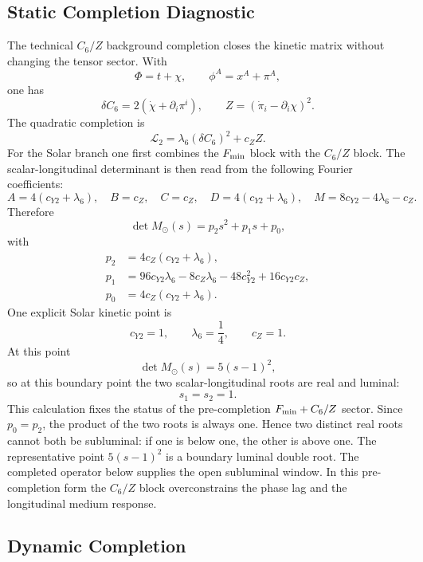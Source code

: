 \documentclass[12pt,a4paper]{article}
\begin{document}
\subsection{Static Completion Diagnostic}

The technical $C_6/Z$ background completion closes the kinetic matrix without changing the tensor sector. With
\[
\Phi=t+\chi,\qquad \phi^A=x^A+\pi^A,
\]
one has
\[
\delta C_6=2(\dot\chi+\partial_i\pi^i),
\qquad
Z=(\dot\pi_i-\partial_i\chi)^2.
\]
The quadratic completion is
\[
\mathcal L_2=\lambda_6(\delta C_6)^2+c_Z Z.
\]
For the Solar branch one first combines the $F_{\rm min}$ block with the
$C_6/Z$ block.  The scalar-longitudinal determinant is then read from the
following Fourier coefficients:
\[
A=4(c_{Y2}+\lambda_6),\quad B=c_Z,\quad C=c_Z,\quad
D=4(c_{Y2}+\lambda_6),\quad
M=8c_{Y2}-4\lambda_6-c_Z.
\]
Therefore
\[
\det M_\odot(s)=p_2s^2+p_1s+p_0,
\]
with
\begin{align*}
p_2&=4c_Z(c_{Y2}+\lambda_6),\\
p_1&=96c_{Y2}\lambda_6-8c_Z\lambda_6-48c_{Y2}^2+16c_{Y2}c_Z,\\
p_0&=4c_Z(c_{Y2}+\lambda_6).
\end{align*}
One explicit Solar kinetic point is
\[
c_{Y2}=1,\qquad \lambda_6=\frac14,\qquad c_Z=1.
\]
At this point
\[
\det M_\odot(s)=5(s-1)^2,
\]
so at this boundary point the two scalar-longitudinal roots are real and
luminal:
\[
s_1=s_2=1.
\]
This calculation fixes the status of the pre-completion $F_{\rm min}+C_6/Z$ sector.
Since $p_0=p_2$, the product of the two roots is always one.  Hence two
distinct real roots cannot both be subluminal: if one is below one, the other
is above one.  The representative point $5(s-1)^2$ is a boundary luminal
double root. The completed operator below supplies the open subluminal window.
In this pre-completion form the $C_6/Z$ block overconstrains the phase lag and the
longitudinal medium response.

\subsection{Dynamic Completion}
\end{document}
